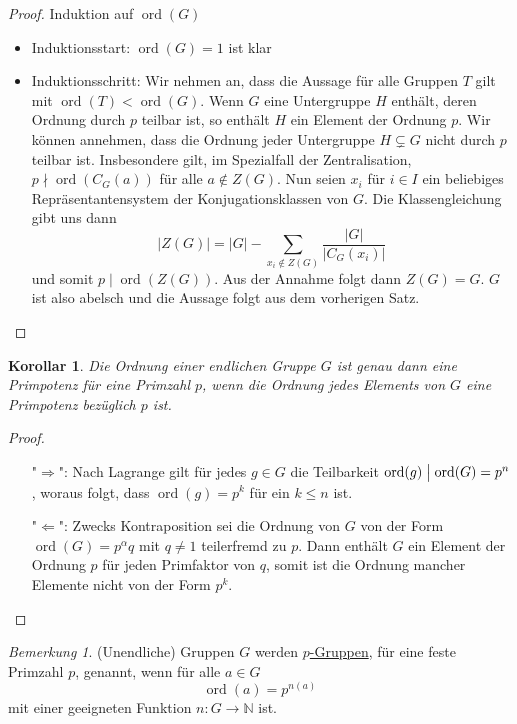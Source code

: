 \documentclass[12pt]{scrartcl} %
\DeclareMathOperator{\ord}{ord}
\newcommand{\divides}{\bigm|}
\newcommand\N{\mathbb{N}}
\newtheorem{kor}{Korollar}
\theoremstyle{definition}
\theoremstyle{remark}
\newtheorem*{nb}{Bemerkung}
\newcommand{\defi}{\underline}
\begin{document}
\begin{proof}
	Induktion auf $\ord(G)$
	\begin{itemize}
	\item Induktionsstart: $\ord(G)=1$ ist klar
	\item Induktionsschritt: Wir nehmen an, dass die Aussage für alle Gruppen \(T\) gilt mit $\ord(T)<\ord(G)$.
		Wenn \(G\) eine Untergruppe \(H\) enthält, deren Ordnung durch \(p\) teilbar ist, so enthält \(H\) ein Element der Ordnung \(p\).
		Wir können annehmen, dass die Ordnung jeder Untergruppe $H \subsetneq G$ nicht durch \(p\) teilbar ist.
		Insbesondere gilt, im Spezialfall der Zentralisation, $p \nmid \ord(C_{G}(a))$ für alle $a \notin Z(G)$.
		Nun seien \(x_i\) für \(i \in I\) ein beliebiges Repräsentantensystem der Konjugationsklassen von \(G\).
		Die Klassengleichung gibt uns dann \[|Z(G)| = |G| - \sum_{x_i \notin Z(G)}\dfrac{|G|}{|C_{G}(x_i)|}\] und somit $p \mid \ord(Z(G))$.
		Aus der Annahme folgt dann \(Z(G)=G\).
		\(G\) ist also abelsch und die Aussage folgt aus dem vorherigen Satz.\qedhere
\end{itemize}
\end{proof}

\begin{kor}
	Die Ordnung einer endlichen Gruppe \(G\) ist genau dann eine Primpotenz für eine Primzahl \(p\), wenn die Ordnung jedes Elements von \(G\) eine Primpotenz bezüglich \(p\) ist.
\end{kor}

\begin{proof}
	\begin{itemize}
	\item["$\Rightarrow$":] Nach Lagrange gilt für jedes \(g\in G\) die Teilbarkeit \(\ord(g) \divides \ord(G)=p^n\), woraus folgt, dass $\ord(g)=p^k$ für ein \(k \leq n\) ist.
	\item["$\Leftarrow$":] Zwecks Kontraposition sei die Ordnung von \(G\) von der Form $\ord(G)=p^\alpha q$ mit $q\neq 1$ teilerfremd zu \(p\).
		Dann enthält \(G\) ein Element der Ordnung \(p\) für jeden Primfaktor von \(q\), somit ist die Ordnung mancher Elemente nicht von der Form $p^k$.
	\end{itemize}
\end{proof}

\begin{nb}
	(Unendliche) Gruppen \(G\) werden \defi{\(p\)-Gruppen}, für eine feste Primzahl \(p\), genannt, wenn für alle \(a \in G\) \[\ord(a)=p^{n(a)}\] mit einer geeigneten Funktion \(n: G \to \N\) ist.
\end{nb}
\end{document}
